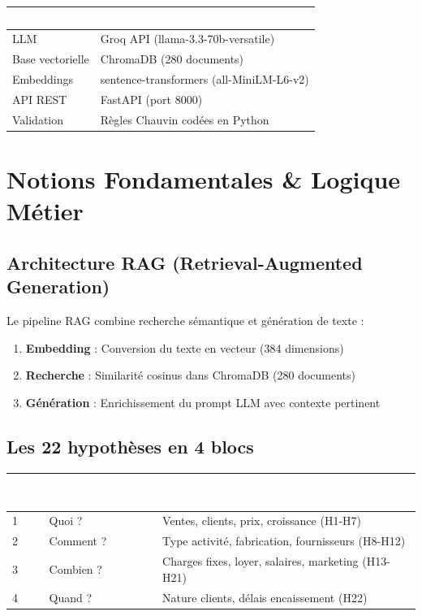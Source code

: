 \documentclass[11pt, a4paper]{article}
\begin{document}
\begin{center}
\begin{tabularx}{0.9\textwidth}{X X}
\toprule
\rowcolor{navyblue}\textcolor{white}{\textbf{Composant}} & \textcolor{white}{\textbf{Technologie}} \\
\midrule
LLM & Groq API (llama-3.3-70b-versatile) \\
Base vectorielle & ChromaDB (280 documents) \\
Embeddings & sentence-transformers (all-MiniLM-L6-v2) \\
API REST & FastAPI (port 8000) \\
Validation & Règles Chauvin codées en Python \\
\bottomrule
\end{tabularx}
\end{center}

\section{Notions Fondamentales \& Logique Métier}

\subsection{Architecture RAG (Retrieval-Augmented Generation)}

Le pipeline RAG combine recherche sémantique et génération de texte :

\begin{enumerate}
  \item \textbf{Embedding} : Conversion du texte en vecteur (384 dimensions)
  \item \textbf{Recherche} : Similarité cosinus dans ChromaDB (280 documents)
  \item \textbf{Génération} : Enrichissement du prompt LLM avec contexte pertinent
\end{enumerate}

\subsection{Les 22 hypothèses en 4 blocs}

\begin{center}
\begin{tabularx}{0.95\textwidth}{X X X}
\toprule
\rowcolor{navyblue}\textcolor{white}{\textbf{Bloc}} & \textcolor{white}{\textbf{Question Chauvin}} & \textcolor{white}{\textbf{Hypothèses}} \\
\midrule
1 & Quoi ? & Ventes, clients, prix, croissance (H1-H7) \\
2 & Comment ? & Type activité, fabrication, fournisseurs (H8-H12) \\
3 & Combien ? & Charges fixes, loyer, salaires, marketing (H13-H21) \\
4 & Quand ? & Nature clients, délais encaissement (H22) \\
\bottomrule
\end{tabularx}
\end{center}
\end{document}
